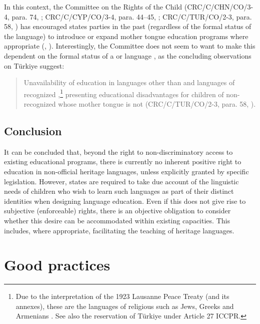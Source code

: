\documentclass[output=paper,colorlinks,citecolor=brown]{langscibook}
\begin{document}
In this context, the Committee on the Rights of the Child (CRC/C/CHN/CO/3-4, para. 74, \citealt{crc2013}; CRC/C/CYP/CO/3-4, para. 44--45, \citealt{crc2012cyprus}; CRC/C/TUR/CO/2-3, para. 58, \citealt{crc2012turkey}) has encouraged states parties in the past (regardless of the formal status of the language) to introduce or expand mother tongue education programs where appropriate (\citealt[1137]{lundy_tobin2019}, \citealt[303]{schmahl2020}). Interestingly, the Committee does not seem to want to make this dependent on the formal status of a  or language \citep[1137]{lundy_tobin2019}, as the concluding observations on Türkiye suggest: 

\begin{quote}
    Unavailability of education in languages other than  and languages of recognized ,\footnote{%
    Due to the  interpretation of the 1923 Lausanne Peace Treaty (and its annexes), these are the languages of religious  such as Jews, Greeks and Armenians \citep[65]{scherzberg2014}. See also the reservation of Türkiye under Article 27 ICCPR.} presenting educational disadvantages for children of non-recognized  whose mother tongue is not  (CRC/C/TUR/CO/2-3, para. 58, \citealt{crc2012turkey}).
\end{quote}

\subsection{Conclusion}\label{CH3.ss.2.4}

It can be concluded that, beyond the right to non-discriminatory access to existing educational programs, there is currently no inherent positive right to education in non-official heritage languages, unless explicitly granted by specific legislation. However, states are required to take due account of the linguistic needs of children who wish to learn such languages as part of their distinct identities when designing language education. Even if this does not give rise to subjective (enforceable) rights, there is an objective obligation to consider whether this desire can be accommodated within existing capacities. This includes, where appropriate, facilitating the teaching of heritage languages.

\section{Good practices}\label{CH3.ss.3}
\end{document}
